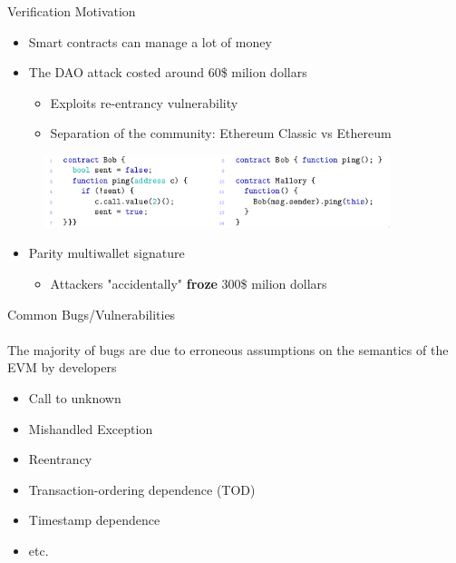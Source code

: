 \begin{frame}{Verification Motivation}
\begin{itemize}
\item Smart contracts can manage a lot of money
\item The DAO attack costed around $60$\$ milion dollars
\begin{itemize}
\item Exploits re-entrancy vulnerability
\item Separation of the community: Ethereum Classic vs Ethereum
\end{itemize}
\end{itemize}

\begin{figure}
\includegraphics[width=0.9\textwidth]{./img/reentrancy}
\end{figure}

\begin{itemize}
\item Parity multiwallet signature
\begin{itemize}
\item Attackers "accidentally" \textbf{froze} $300$\$ milion dollars
\end{itemize}
\end{itemize}

\end{frame}

\begin{frame}{Common Bugs/Vulnerabilities}
\framesubtitle{\cite{bib:atzei,luu2016making}}
The majority of bugs are due to erroneous assumptions on the semantics of the EVM by developers
\begin{itemize}
\item Call to unknown
\item Mishandled Exception
\item Reentrancy
\item Transaction-ordering dependence (TOD)
\item Timestamp dependence
\item etc.
\end{itemize}

\end{frame}


